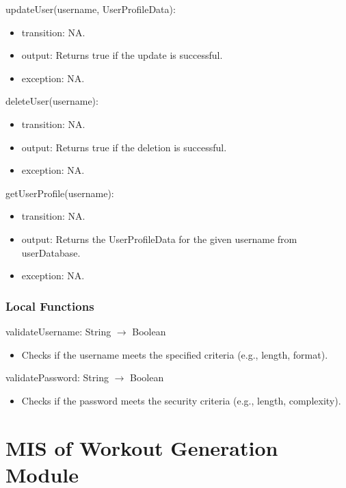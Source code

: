 \documentclass[12pt, titlepage]{article}
\begin{document}
\noindent updateUser(username, UserProfileData):
\begin{itemize}
\item transition: NA.
\item output: Returns true if the update is successful.
\item exception: NA.
\end{itemize}

\noindent deleteUser(username):
\begin{itemize}
\item transition: NA.
\item output: Returns true if the deletion is successful.
\item exception: NA.
\end{itemize}

\noindent getUserProfile(username):
\begin{itemize}
\item transition: NA.
\item output: Returns the UserProfileData for the given username from userDatabase.
\item exception: NA.
\end{itemize}



\subsubsection{Local Functions}
\noindent validateUsername: String $\rightarrow$ Boolean
\begin{itemize}
\item Checks if the username meets the specified criteria (e.g., length, format).
\end{itemize}

\noindent validatePassword: String $\rightarrow$ Boolean
\begin{itemize}
\item Checks if the password meets the security criteria (e.g., length, complexity).
\end{itemize}

\section{MIS of Workout Generation Module}
\end{document}
